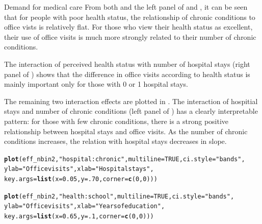 \documentclass[11pt]{book}\usepackage[]{graphicx}\usepackage[]{color}
\makeatletter
\newcommand{\hlnum}[1]{\textcolor[rgb]{0.686,0.059,0.569}{#1}}%
\newcommand{\hlstr}[1]{\textcolor[rgb]{0.192,0.494,0.8}{#1}}%
\newcommand{\hlstd}[1]{\textcolor[rgb]{0.345,0.345,0.345}{#1}}%
\newcommand{\hlkwc}[1]{\textcolor[rgb]{0.333,0.667,0.333}{#1}}%
\newcommand{\hlkwd}[1]{\textcolor[rgb]{0.737,0.353,0.396}{\textbf{#1}}}%
\newenvironment{kframe}{%
 \def\at@end@of@kframe{}%
 \ifinner\ifhmode%
  \def\at@end@of@kframe{\end{minipage}}%
  \begin{minipage}{\columnwidth}%
 \fi\fi%
 \def\FrameCommand##1{\hskip\@totalleftmargin \hskip-\fboxsep
 \colorbox{shadecolor}{##1}\hskip-\fboxsep
     \hskip-\linewidth \hskip-\@totalleftmargin \hskip\columnwidth}%
 \MakeFramed {\advance\hsize-\width
   \@totalleftmargin\z@ \linewidth\hsize
   \@setminipage}}%
 {\par\unskip\endMakeFramed%
 \at@end@of@kframe}
\newenvironment{knitrout}{}{} %
\renewenvironment{knitrout}{\small\renewcommand{\baselinestretch}{.85}}{} %
\makeatother
\begin{document}
\begin{Example}[nmes2a]{Demand for medical care}
From both  and the left panel of 
and , it can be seen that for people with poor health
status, the relationship of chronic conditions to office vists is
relatively flat. For those who view their health status as excellent,
their use of office visits is much more strongly related to their number
of chronic conditions.

The interaction of perceived health status with number of
hospital stays (right panel of ) shows that 
the difference in office visits according to health status is mainly
important only for those with 0 or 1 hospital stays.

The remaining two interaction effects are plotted in .
The interaction of hospitial stays and number of chronic
conditions (left panel of )
has a clearly interpretable pattern: for those with few
chronic conditions, there is a strong positive relationship between
hospital stays and office visits. As the number of chronic conditions
increases, the relation with hospital stays decreases in slope.

\begin{knitrout}
\color{fgcolor}\begin{kframe}
\begin{alltt}
\hlkwd{plot}\hlstd{(eff_nbin2,} \hlstr{"hospital:chronic"}\hlstd{,} \hlkwc{multiline}\hlstd{=}\hlnum{TRUE}\hlstd{,} \hlkwc{ci.style}\hlstd{=}\hlstr{"bands"}\hlstd{,}
     \hlkwc{ylab} \hlstd{=} \hlstr{"Office visits"}\hlstd{,} \hlkwc{xlab}\hlstd{=}\hlstr{"Hospital stays"}\hlstd{,}
     \hlkwc{key.args} \hlstd{=} \hlkwd{list}\hlstd{(}\hlkwc{x} \hlstd{=} \hlnum{0.05}\hlstd{,} \hlkwc{y} \hlstd{=} \hlnum{.70}\hlstd{,} \hlkwc{corner} \hlstd{=} \hlkwd{c}\hlstd{(}\hlnum{0}\hlstd{,} \hlnum{0}\hlstd{)))}

\hlkwd{plot}\hlstd{(eff_nbin2,} \hlstr{"health:school"}\hlstd{,} \hlkwc{multiline}\hlstd{=}\hlnum{TRUE}\hlstd{,}  \hlkwc{ci.style}\hlstd{=}\hlstr{"bands"}\hlstd{,}
     \hlkwc{ylab} \hlstd{=} \hlstr{"Office visits"}\hlstd{,} \hlkwc{xlab}\hlstd{=}\hlstr{"Years of education"}\hlstd{,}
     \hlkwc{key.args} \hlstd{=} \hlkwd{list}\hlstd{(}\hlkwc{x} \hlstd{=} \hlnum{0.65}\hlstd{,} \hlkwc{y} \hlstd{=} \hlnum{.1}\hlstd{,} \hlkwc{corner} \hlstd{=} \hlkwd{c}\hlstd{(}\hlnum{0}\hlstd{,} \hlnum{0}\hlstd{)))}
\end{alltt}
\end{kframe}\begin{figure}[!htbp]



\end{figure}
\end{knitrout}
\end{Example}
\end{document}
